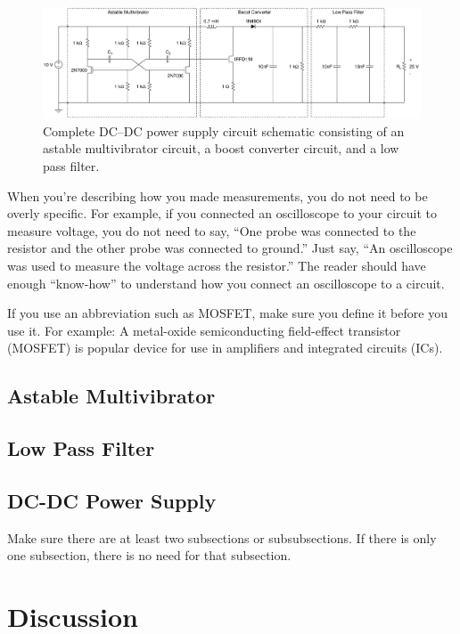 \documentclass[11pt]{article}
\begin{document}
\begin{figure}[ht]
\centering
\includegraphics[width=6.5in]{dcdc}
\caption{Complete DC--DC power supply circuit schematic consisting of an astable multivibrator circuit, a boost converter circuit, and a low pass filter.}
\label{powersupply}
\end{figure}

When you’re describing how you made measurements, you do not need to be overly specific. For example, if you connected an oscilloscope to your circuit to measure voltage, you do not need to say, “One probe was connected to the resistor and the other probe was connected to ground.” Just say, “An oscilloscope was used to measure the voltage across the resistor.” The reader should have enough “know-how” to understand how you connect an oscilloscope to a circuit.

If you use an abbreviation such as MOSFET, make sure you define it before you use it. For example: A metal-oxide semiconducting field-effect transistor (MOSFET) is popular device for use in amplifiers and integrated circuits (ICs).

\subsection{Astable Multivibrator}

\subsection{Low Pass Filter}

\subsection{DC-DC Power Supply}

Make sure there are at least two subsections or subsubsections. If there is only one subsection, there is no need for that subsection.  
	
\section{Discussion}
\label{dis_section}
\end{document}
